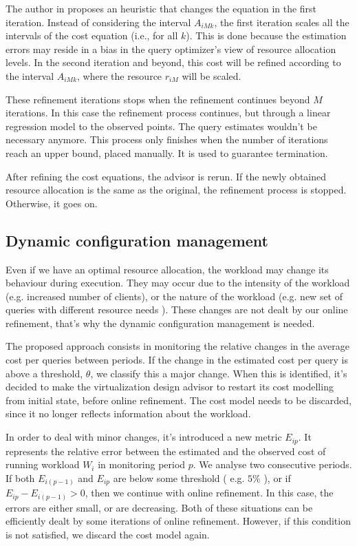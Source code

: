 The author in \cite{Soror:2008:AVM:1376616.1376711} proposes an heuristic that changes the equation in the first iteration. Instead of  considering the interval $A_{iMk}$, the first iteration scales all the intervals of the cost equation (i.e., for all $k$). This is done because the estimation errors may reside in a bias in the query optimizer's view of resource allocation levels. In the second iteration and beyond, this cost will be refined according to the interval $A_{iMk}$, where the resource $r_{iM}$ will be scaled.

These refinement iterations stops when the refinement continues beyond $M$ iterations. In this case the refinement process continues, but through a linear regression model to the observed points. The query estimates wouldn't be necessary anymore. This process only finishes when the number of iterations reach an upper bound, placed manually. It is used to guarantee termination.

After refining the cost equations, the advisor is rerun. If the newly obtained resource allocation is the same as the original, the refinement process is stopped. Otherwise, it goes on.

\subsection{Dynamic configuration management}

Even if we have an optimal resource allocation, the workload may change its behaviour during execution. They may occur due to the intensity of the workload (e.g. increased number of clients), or the nature of the workload (e.g. new set of queries with different resource needs ). These changes are not dealt by our online refinement, that's why the dynamic configuration management is needed. 

The proposed approach consists in monitoring the relative changes in the average cost per queries between periods. If the change in the estimated cost per query is above a threshold, $\theta$, we classify this a major change. When this is identified, it's decided to make the virtualization design advisor to restart its cost modelling from initial state, before online refinement. The cost model needs to be discarded, since it no longer reflects information about the workload.

In order to deal with minor changes, it's introduced a new metric $E_{ip}$. It represents the relative error between the estimated and the observed cost of running workload $W_{i}$ in monitoring period $p$. We analyse two consecutive periods. If both $E_{i(p-1)}$ and $E_{ip}$ are below some threshold ( e.g. $5\%$ ), or if $E_{ip} - E_{i(p-1)} > 0$, then we continue with online refinement. In this case, the errors are either small, or are decreasing. Both of these situations can be efficiently dealt by some iterations of online refinement. However, if this condition is not satisfied, we discard the cost model again. 